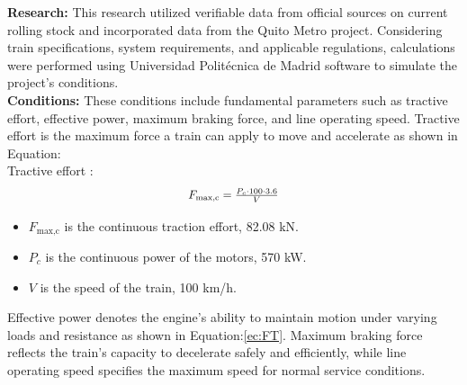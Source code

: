 \documentclass[conference]{IEEEtran}
\begin{document}
\textbf{Research:}
This research utilized verifiable data from official sources on current rolling stock and incorporated data from the Quito Metro project\cite{b11}. Considering train specifications, system requirements\cite{b17}, and applicable regulations\cite{b16}, calculations were performed using Universidad Politécnica de Madrid software to simulate the project's conditions\cite{b4}.\\

\textbf{Conditions:}
These conditions include fundamental parameters such as tractive effort, effective power, maximum braking force, and line operating speed. Tractive effort is the maximum force a train can apply to move and accelerate as shown in Equation:\\

Tractive effort \cite{b16}:
\begin{equation}
\scalebox{0.9}{$
F_{\text{max,c}} = \frac{P_{c} \cdot 100 \cdot 3.6}{V}   
$}
\label{ec:FT}
\end{equation}
\begin{itemize}
    \item $F_{\text{max,c}}$ is the continuous traction effort, 82.08 kN.
    \item $P_{c}$ is the continuous power of the motors, 570 kW. 
    \item $V$ is the speed of the train, 100 km/h.
\end{itemize}
Effective power denotes the engine's ability to maintain motion under varying loads and resistance as shown in Equation:\eqref{ec:FT}. Maximum braking force reflects the train's capacity to decelerate safely and efficiently, while line operating speed specifies the maximum speed for normal service conditions\cite{b16}.
\end{document}
